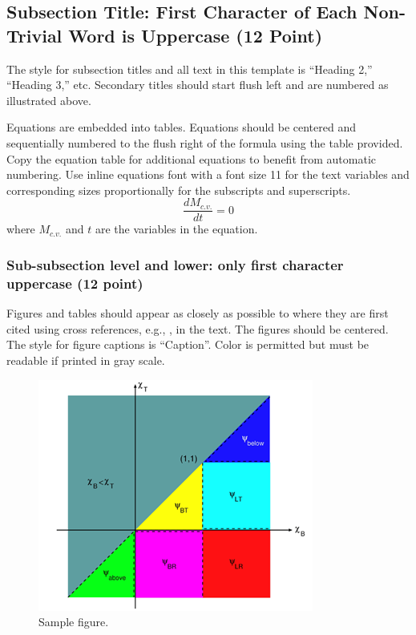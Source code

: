 \documentclass[letterpaper]{physor2024}
\begin{document}
\subsection{Subsection Title: First Character of Each Non-Trivial Word is Uppercase (12 Point)}
The style for subsection titles and all text in this template is ``Heading 2,'' ``Heading 3,'' etc.
Secondary titles should start flush left and are numbered as illustrated above.

Equations are embedded into tables. Equations should be centered and sequentially numbered to the flush right of the formula using the table provided.
Copy the equation table for additional equations to benefit from automatic numbering.
Use inline equations font with a font size 11 for the text variables and corresponding sizes proportionally for the subscripts and superscripts.
\begin{equation}
    \frac{dM_{c.v.}}{dt} = 0
\end{equation}
where $M_{c.v.}$ and $t$ are the variables in the equation.

\subsubsection{Sub-subsection level and lower: only first character uppercase (12 point)}
Figures and tables should appear as closely as possible to where they are first cited using cross references, e.g., , in the text. The figures should be centered. The style for figure captions is ``Caption''. Color is permitted but must be readable if printed in gray scale.
\begin{figure}[h!]
    \centering
    \includegraphics{samplefigure.png}
    \caption{Sample figure.}
    \label{fig:sample}
\end{figure}
\end{document}
